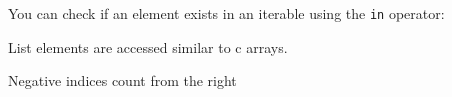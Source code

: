 \begin{Shaded}
\begin{Highlighting}[]
\NormalTok{[}\NormalTok{, }\NormalTok{, }\NormalTok{, }\NormalTok{, }\NormalTok{]}
\end{Highlighting}
\end{Shaded}

You can check if an element exists in an iterable using the \texttt{in}
operator:

\begin{Shaded}
\begin{Highlighting}[]
 \NormalTok{ [}\NormalTok{,}\NormalTok{,}\NormalTok{,}\NormalTok{,}\NormalTok{,[]]}
\end{Highlighting}
\end{Shaded}

\begin{Shaded}
\begin{Highlighting}[]
\end{Highlighting}
\end{Shaded}

List elements are accessed similar to c arrays.

\begin{Shaded}
\begin{Highlighting}[]
\OperatorTok{=}\NormalTok{ [}\NormalTok{,}\NormalTok{,}\NormalTok{,}\NormalTok{,}\NormalTok{,[]]}
\NormalTok{l[}\NormalTok{]}
\end{Highlighting}
\end{Shaded}

\begin{Shaded}
\begin{Highlighting}[]
\end{Highlighting}
\end{Shaded}

Negative indices count from the right

\begin{Shaded}
\begin{Highlighting}[]
\NormalTok{l[}\OperatorTok{{-}}\NormalTok{]}
\end{Highlighting}
\end{Shaded}

\begin{Shaded}
\begin{Highlighting}[]
\NormalTok{[]}
\end{Highlighting}
\end{Shaded}


